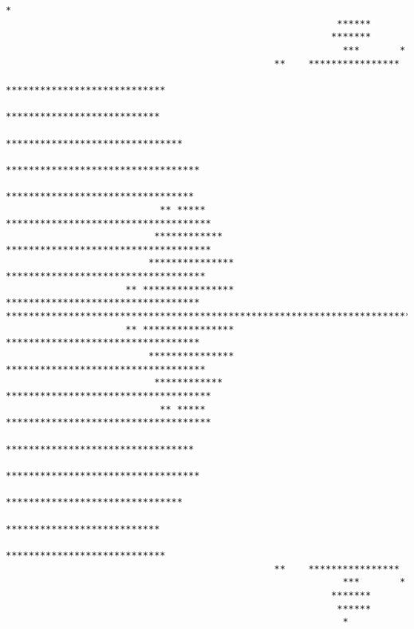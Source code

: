 \documentclass[10pt, twoside,a4paper]{article}
\begin{document}
\begin{lstlisting}[keepspaces=true]
                                                           *                     
                                                          ******                 
                                                         *******                 
                                                           ***       *           
                                               **    ****************            
                                               ****************************      
                                              ***************************        
                                            *******************************      
                                           **********************************    
                                           *********************************     
                           ** *****      ************************************    
                          ************   ************************************    
                         *************** ***********************************     
                     ** **************** **********************************      
*************************************************************************        
                     ** **************** **********************************      
                         *************** ***********************************     
                          ************   ************************************    
                           ** *****      ************************************    
                                           *********************************     
                                           **********************************    
                                            *******************************      
                                              ***************************        
                                               ****************************      
                                               **    ****************            
                                                           ***       *           
                                                         *******                 
                                                          ******                 
                                                           *  
\end{lstlisting}

\newpage
\end{document}
